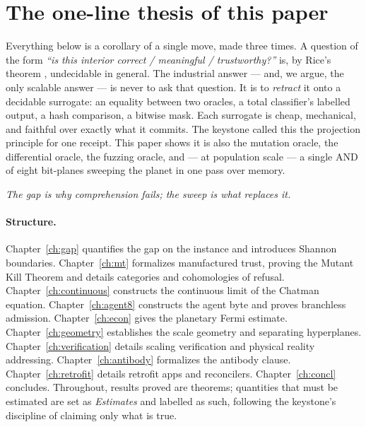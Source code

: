 \documentclass[11pt,oneside]{book}
\theoremstyle{definition}
\theoremstyle{plain}
\theoremstyle{remark}
\begin{document}
\section{The one-line thesis of this paper}
Everything below is a corollary of a single move, made three times. %
A question of the form \emph{``is this interior correct / meaningful / trustworthy?''} is, by Rice's theorem \cite{rice1953}, undecidable in general. %
The industrial answer --- and, we argue, the only scalable answer --- is never to ask that question. %
It is to \emph{retract} it onto a decidable surrogate: an equality between two oracles, a total classifier's labelled output, a hash comparison, a bitwise mask. %
Each surrogate is cheap, mechanical, and faithful over exactly what it commits. %
The keystone called this the projection principle for one receipt. %
This paper shows it is also the mutation oracle, the differential oracle, the fuzzing oracle, and --- at population scale --- a single AND of eight bit-planes sweeping the planet in one pass over memory. %

\begin{center}\itshape
The gap is why comprehension fails; the sweep is what replaces it. %
\end{center}

\paragraph{Structure.} Chapter~\ref{ch:gap} quantifies the gap on the instance and introduces Shannon boundaries. %
Chapter~\ref{ch:mt} formalizes manufactured trust, proving the Mutant Kill Theorem and details categories and cohomologies of refusal. %
Chapter~\ref{ch:continuous} constructs the continuous limit of the Chatman equation. %
Chapter~\ref{ch:agent8} constructs the agent byte and proves branchless admission. %
Chapter~\ref{ch:econ} gives the planetary Fermi estimate. %
Chapter~\ref{ch:geometry} establishes the scale geometry and separating hyperplanes. %
Chapter~\ref{ch:verification} details scaling verification and physical reality addressing. %
Chapter~\ref{ch:antibody} formalizes the antibody clause. %
Chapter~\ref{ch:retrofit} details retrofit apps and reconcilers. %
Chapter~\ref{ch:concl} concludes. %
Throughout, results proved are theorems; quantities that must be estimated are set as \emph{Estimates} and labelled as such, following the keystone's discipline of claiming only what is true. %
\end{document}
